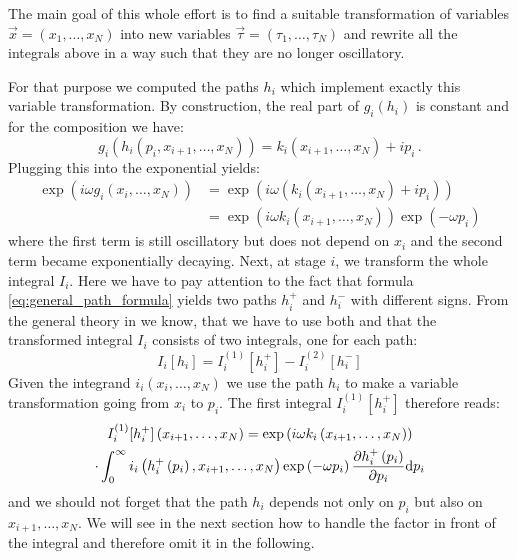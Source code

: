 \documentclass[a4paper,10pt]{article}
\begin{document}
The main goal of this whole effort is to find a suitable transformation of
variables $\vec{x} = \left(x_1,\ldots,x_N\right)$ into new
variables $\vec{\tau} = \left(\tau_1,\ldots,\tau_N\right)$ and
rewrite all the integrals above in a way such that they are no longer
oscillatory.

For that purpose we computed the paths $h_i$ which implement exactly
this variable transformation. By construction, the real part of
$g_i\left(h_i\right)$ is constant and for the composition we have:
\begin{equation}
  g_i\left(h_i\left(p_i, x_{i+1},\ldots,x_N\right)\right)
  = k_i\left(x_{i+1},\ldots,x_N\right)
  + i p_i \,.
\end{equation}
Plugging this into the exponential yields:
\begin{equation}
\begin{split}
  \exp\left(i\omega g_i\left(x_i,\ldots,x_N\right)\right)
  & = \exp\left(i\omega \left(k_i\left(x_{i+1},\ldots,x_N\right) + i p_i\right)\right) \\
  & = \exp\left(i\omega k_i\left(x_{i+1},\ldots,x_N\right)\right)
      \exp\left(- \omega p_i\right)
\end{split}
\end{equation}
where the first term is still oscillatory but does not depend on $x_i$
and the second term became exponentially decaying. Next, at stage $i$, we
transform the whole integral $I_i$. Here we have to pay attention to the
fact that formula \eqref{eq:general_path_formula} yields two paths $h_i^{+}$
and $h_i^{-}$ with different signs. From the general theory in \cite{AH_cgq}
we know, that we have to use both and that the transformed integral $I_i$
consists of two integrals, one for each path:
\begin{equation}
  I_i[h_i] = I_i^{(1)}[h_i^{+}] - I_i^{(2)}[h_i^{-}]
\end{equation}
Given the integrand $i_i(x_i, \ldots, x_N)$ we use the path $h_i$
to make a variable transformation going from $x_i$ to $p_i$. The first
integral $I_i^{(1)}[h_i^{+}]$ therefore reads:
\begin{multline}
  I_i^{(1)}[h_i^{+}]\left(x_{i+1},\ldots,x_N\right) =
  \exp\left(i\omega k_i\left(x_{i+1},\ldots,x_N\right)\right)
  \\
  \cdot
  \int_0^\infty
    i_i\left(h_i^{+}\left(p_i\right), x_{i+1},\ldots,x_N\right)
    \exp\left(- \omega p_i\right)
    \frac{\partial h_i^{+}\left(p_i\right)}{\partial p_i}
  \mathrm{d}p_i
\end{multline}
and we should not forget that the path $h_i$ depends not only
on $p_i$ but also on $x_{i+1},\ldots,x_N$. We will see in the
next section how to handle the factor in front of the integral
and therefore omit it in the following.
\end{document}
